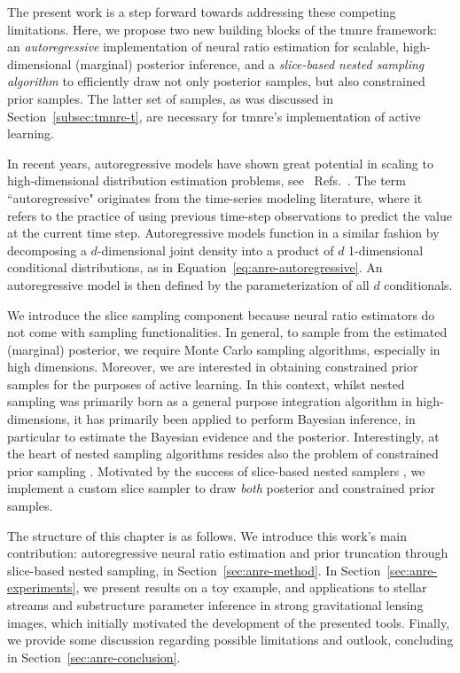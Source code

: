 The present work is a step forward towards addressing these competing limitations. Here, we propose two new building blocks of the \gls*{tmnre} framework: an \emph{autoregressive} implementation of neural ratio estimation for scalable, high-dimensional (marginal) posterior inference, and a \emph{slice-based nested sampling algorithm} to efficiently draw not only posterior samples, but also constrained prior samples. The latter set of samples, as was discussed in Section~\ref{subsec:tmnre-t}, are necessary for \gls*{tmnre}'s implementation of active learning. 

In recent years, autoregressive models have shown great potential in scaling to high-dimensional distribution estimation problems, see \eg~Refs.~\cite{Germain:2015yft, Uria:2016aa, Papamakarios:2017tec}. The term ``autoregressive" originates from the time-series modeling literature, where it refers to the practice of using previous time-step observations to predict the value at the current time step. Autoregressive models function in a similar fashion by decomposing a $d$-dimensional joint density into a product of $d$ 1-dimensional conditional distributions, as in Equation~\eqref{eq:anre-autoregressive}. An autoregressive model is then defined by the parameterization of all $d$ conditionals.

We introduce the slice sampling component because neural ratio estimators do not come with sampling functionalities. In general, to sample from the estimated (marginal) posterior, we require Monte Carlo sampling algorithms, especially in high dimensions. Moreover, we are interested in obtaining constrained prior samples for the purposes of active learning. In this context, whilst nested sampling was primarily born as a general purpose integration algorithm in high-dimensions, it has primarily been applied to perform Bayesian inference, in particular to estimate the Bayesian evidence and the posterior. Interestingly, at the heart of nested sampling algorithms resides also the problem of constrained prior sampling \cite{Ashton:2022grj}. Motivated by the success of slice-based nested samplers \cite{Neal:aa, Handley:2015fda}, we implement a custom slice sampler to draw \emph{both} posterior and constrained prior samples.  

\vspace{10pt}
 The structure of this chapter is as follows. We introduce this work's main contribution: autoregressive neural ratio estimation and prior truncation through slice-based nested sampling, in Section~\ref{sec:anre-method}. In Section~\ref{sec:anre-experiments}, we present results on a toy example, and applications to stellar streams and substructure parameter inference in strong gravitational lensing images, which initially motivated the development of the presented tools. Finally, we provide some discussion regarding possible limitations and outlook, concluding in Section~\ref{sec:anre-conclusion}. 

